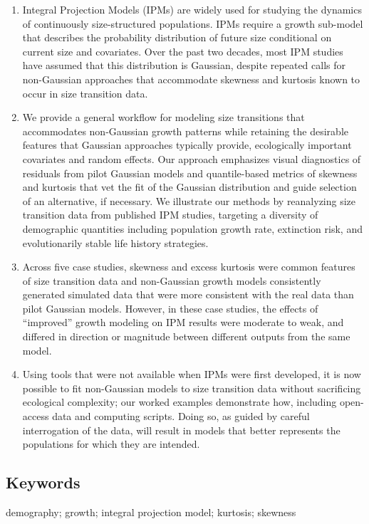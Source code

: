 \documentclass[12pt]{article}
\begin{document}
\begin{enumerate}
	\item Integral Projection Models (IPMs) are widely used for studying the dynamics of continuously size-structured populations. IPMs require a growth sub-model that describes the probability distribution of future size conditional on current size and covariates. Over the past two decades, most IPM studies have assumed that this distribution is Gaussian, despite repeated calls for non-Gaussian approaches that accommodate skewness and kurtosis known to occur in size transition data. %
	\item We provide a general workflow for modeling size transitions that accommodates non-Gaussian growth patterns while retaining the desirable features that Gaussian approaches typically provide, ecologically important covariates and random effects. Our approach emphasizes visual diagnostics of residuals from pilot Gaussian models and quantile-based metrics of skewness and kurtosis that vet the fit of the Gaussian distribution and guide selection of an alternative, if necessary. We illustrate our methods by reanalyzing size transition data from published IPM studies, targeting a diversity of demographic quantities including population growth rate, extinction risk, and evolutionarily stable life history strategies. %
	\item Across five case studies, skewness and excess kurtosis were common features of size transition data and non-Gaussian growth models consistently generated simulated data that were more consistent with the real data than pilot Gaussian models. However, in these case studies, the effects of ``improved'' growth modeling on IPM results were moderate to weak, and differed in direction or magnitude between different outputs from the same model. 
	\item Using tools that were not available when IPMs were first developed, it is now possible to fit non-Gaussian models to size transition data without sacrificing ecological complexity; our worked examples demonstrate how, including open-access data and computing scripts. Doing so, as guided by careful interrogation of the data, will result in models that better represents the populations for which they are intended. %
\end{enumerate}

\subsection*{Keywords}
demography; growth; integral projection model; kurtosis; skewness
\end{document}
